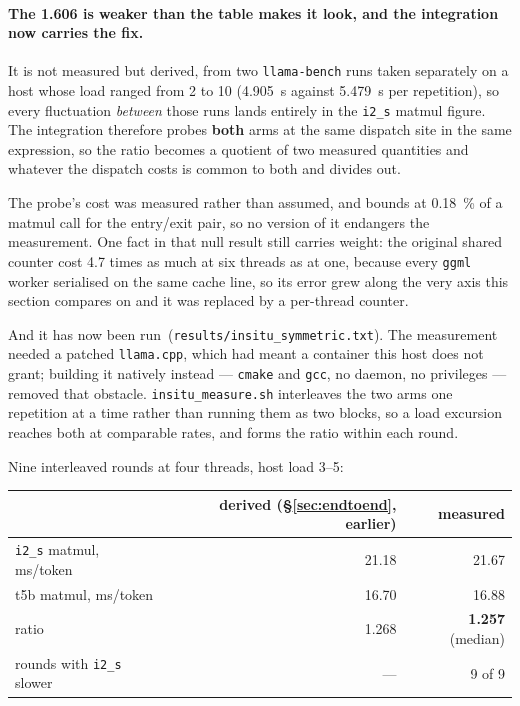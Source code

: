\documentclass[11pt,a4paper]{article}
\newcommand{\code}[1]{\texttt{#1}}
\begin{document}
\paragraph{The \num{1.606} is weaker than the table makes it look, and the
integration now carries the fix.} It is not measured but derived, from two
\code{llama-bench} runs taken separately on a host whose load ranged from 2 to
10 (\SI{4.905}{\second} against \SI{5.479}{\second} per repetition), so every
fluctuation \emph{between} those runs lands entirely in the \code{i2\_s} matmul
figure. The integration therefore probes \textbf{both} arms at the same
dispatch site in the same expression, so
the ratio becomes a quotient of two measured quantities and whatever the
dispatch costs is common to both and divides out.

The probe's cost was measured rather than assumed, and bounds at
\SI{0.18}{\percent} of a matmul call for the entry/exit pair, so no version of
it endangers the measurement. One fact in that null result still carries weight:
the original shared counter cost \num{4.7} times as much at six threads as at
one, because every \code{ggml} worker serialised on the same cache line, so its
error grew along the very axis this section compares on and it was replaced by a
per-thread counter.

And it has now been run~(\code{results/insitu\_symmetric.txt}). The measurement needed a patched
\code{llama.cpp}, which had meant a container this host does not grant; building
it natively instead --- \code{cmake} and \code{gcc}, no daemon, no privileges
--- removed that obstacle. \code{insitu\_measure.sh} interleaves the two
arms one repetition at a time rather than running them as two blocks, so a load
excursion reaches both at comparable rates, and forms the ratio within each
round.

Nine interleaved rounds at four threads, host load 3--5:

\begin{center}
\begin{tabular}{lrr}
\toprule
 & derived (\S\ref{sec:endtoend}, earlier) & measured \\
\midrule
\code{i2\_s} matmul, ms/token & \num{21.18} & \num{21.67} \\
t5b matmul, ms/token          & \num{16.70} & \num{16.88} \\
ratio                          & \num{1.268} & \textbf{\num{1.257}} (median) \\
rounds with \code{i2\_s} slower & ---        & 9 of 9 \\
\bottomrule
\end{tabular}
\end{center}
\end{document}
